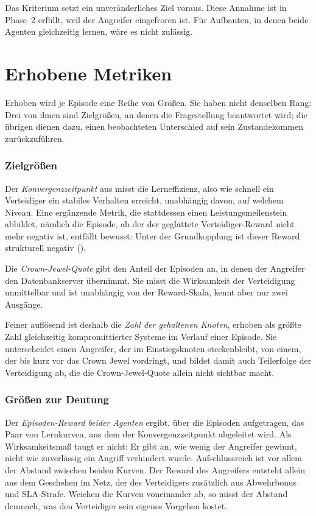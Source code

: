 Das Kriterium setzt ein unveränderliches Ziel voraus. Diese Annahme ist in
Phase~2 erfüllt, weil der Angreifer eingefroren ist. Für Aufbauten, in denen
beide Agenten gleichzeitig lernen, wäre es nicht zulässig.

\section{Erhobene Metriken}
\label{sec:metriken}

Erhoben wird je Episode eine Reihe von Größen. Sie haben nicht denselben Rang:
Drei von ihnen sind Zielgrößen, an denen die Fragestellung beantwortet wird;
die übrigen dienen dazu, einen beobachteten Unterschied auf sein Zustandekommen
zurückzuführen.

\subsubsection{Zielgrößen}

Der \emph{Konvergenzzeitpunkt} aus  misst die
Lerneffizienz, also wie schnell ein Verteidiger ein stabiles Verhalten
erreicht, unabhängig davon, auf welchem Niveau. Eine ergänzende Metrik, die
stattdessen einen Leistungsmeilenstein abbildet, nämlich die Episode, ab der
der geglättete Verteidiger-Reward nicht mehr negativ ist, entfällt bewusst:
Unter der Grundkopplung ist dieser Reward strukturell negativ
().

Die \emph{Crown-Jewel-Quote} gibt den Anteil der Episoden an, in denen der
Angreifer den Datenbankserver übernimmt. Sie misst die Wirksamkeit der
Verteidigung unmittelbar und ist unabhängig von der Reward-Skala, kennt aber
nur zwei Ausgänge.

Feiner auflösend ist deshalb die \emph{Zahl der gehaltenen Knoten}, erhoben als
größte Zahl gleichzeitig kompromittierter Systeme im Verlauf einer Episode. Sie
unterscheidet einen Angreifer, der im Einstiegsknoten steckenbleibt, von einem,
der bis kurz vor das Crown Jewel vordringt, und bildet damit auch Teilerfolge
der Verteidigung ab, die die Crown-Jewel-Quote allein nicht sichtbar macht.

\subsubsection{Größen zur Deutung}

Der \emph{Episoden-Reward beider Agenten} ergibt, über die Episoden
aufgetragen, das Paar von Lernkurven, aus dem der Konvergenzzeitpunkt
abgeleitet wird. Als Wirksamkeitsmaß taugt er nicht: Er gibt an, wie wenig der
Angreifer gewinnt, nicht wie zuverlässig ein Angriff verhindert wurde.
Aufschlussreich ist vor allem der Abstand zwischen beiden Kurven. Der Reward
des Angreifers entsteht allein aus dem Geschehen im Netz, der des Verteidigers
zusätzlich aus Abwehrbonus und \ac{SLA}-Strafe. Weichen die Kurven
voneinander ab, so misst der Abstand demnach, was den Verteidiger sein eigenes
Vorgehen kostet.

